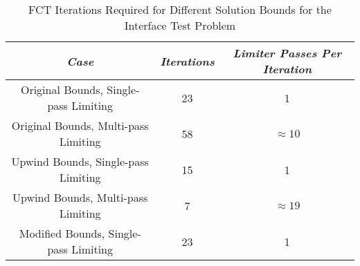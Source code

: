 \begin{table}[htb]\caption{FCT Iterations Required for Different Solution Bounds
  for the Interface Test Problem}
\label{tab:interface_iterations}
\centering
\begin{tabular}{c c c}\toprule
\emph{Case} & \emph{Iterations} & \emph{Limiter Passes Per Iteration}\\\midrule
Original Bounds, Single-pass Limiting & 23 & 1\\
Original Bounds, Multi-pass Limiting  & 58 & $\approx 10$\\
Upwind Bounds,   Single-pass Limiting & 15 & 1\\
Upwind Bounds,   Multi-pass Limiting  & 7  & $\approx 19$\\
Modified Bounds, Single-pass Limiting & 23 & 1\\
\bottomrule\end{tabular}
\end{table}

\clearpage
